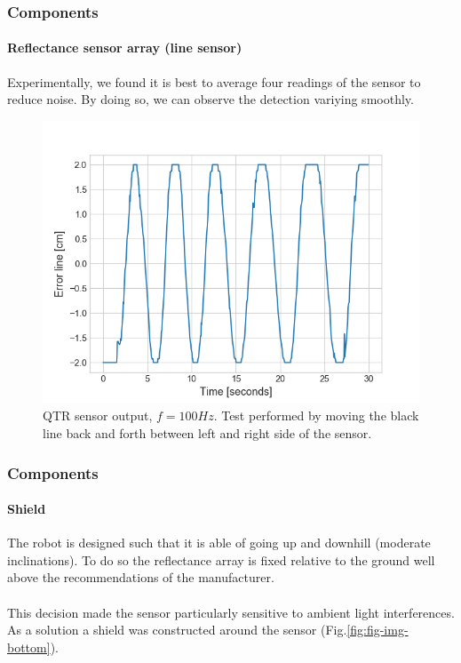\documentclass[10pt]{beamer}
\begin{document}
\begin{frame}
\frametitle{Components}
\framesubtitle{Reflectance sensor array (line sensor)}
Experimentally, we found it is best to average four readings of the sensor to reduce noise. By doing so, we can observe the detection variying smoothly.
\vspace*{-3mm}
\begin{figure}[hbtp]
\centering
\label{fig:flow-qtr}
\includegraphics[scale=0.45]{figures/qtr-flow.png}
\vspace*{-2mm}
\caption{QTR sensor output, $f=100Hz$. Test performed by moving the black line back and forth between left and right side of the sensor.}
\end{figure}
\end{frame}


\begin{frame}
\frametitle{Components}
\framesubtitle{Shield}
The robot is designed such that it is able of going up and downhill (moderate inclinations). To do so the reflectance array is fixed relative to the ground well above the recommendations of the manufacturer. \\~\\
This decision made the sensor particularly sensitive to ambient light interferences. As a solution a shield was constructed around the sensor (Fig.\ref{fig:fig-img-bottom}).
\end{frame}

\end{document}
